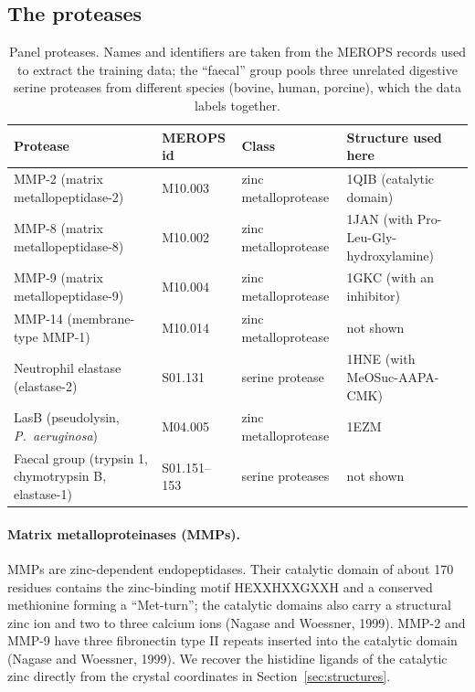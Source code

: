 \subsection{The proteases}
\begin{table}[!htbp]
\centering\small
\begin{tabular}{@{}>{\raggedright\arraybackslash}p{5.4cm}l>{\raggedright\arraybackslash}p{3.0cm}>{\raggedright\arraybackslash}p{4.4cm}@{}}\toprule
Protease & MEROPS id & Class & Structure used here \\\midrule
MMP-2 (matrix metallopeptidase-2) & M10.003 & zinc metalloprotease & 1QIB (catalytic domain) \\
MMP-8 (matrix metallopeptidase-8) & M10.002 & zinc metalloprotease & 1JAN (with Pro-Leu-Gly-hydroxylamine) \\
MMP-9 (matrix metallopeptidase-9) & M10.004 & zinc metalloprotease & 1GKC (with an inhibitor) \\
MMP-14 (membrane-type MMP-1) & M10.014 & zinc metalloprotease & not shown \\
Neutrophil elastase (elastase-2) & S01.131 & serine protease & 1HNE (with MeOSuc-AAPA-CMK) \\
LasB (pseudolysin, \emph{P.\ aeruginosa}) & M04.005 & zinc metalloprotease & 1EZM \\
Faecal group (trypsin 1, chymotrypsin B, elastase-1) & S01.151--153 & serine proteases & not shown \\\bottomrule
\end{tabular}
\caption{Panel proteases. Names and identifiers are taken from the MEROPS records used to extract the training data; the ``faecal'' group pools three unrelated digestive serine proteases from different species (bovine, human, porcine), which the data labels together.}
\label{tab:panel}
\end{table}

\paragraph{Matrix metalloproteinases (MMPs).} MMPs are zinc-dependent endopeptidases. Their catalytic domain of about 170 residues contains the zinc-binding motif HEXXHXXGXXH and a conserved methionine forming a ``Met-turn''; the catalytic domains also carry a structural zinc ion and two to three calcium ions (Nagase and Woessner, 1999). MMP-2 and MMP-9 have three fibronectin type II repeats inserted into the catalytic domain (Nagase and Woessner, 1999). We recover the histidine ligands of the catalytic zinc directly from the crystal coordinates in Section~\ref{sec:structures}.


